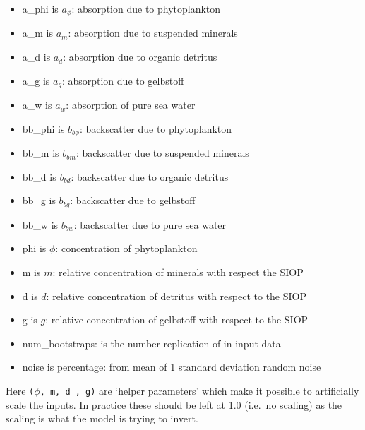 \documentclass{article}
\begin{document}
\begin{itemize}
\itemsep1pt\parskip0pt
\item
  a\_phi is $a_\phi$: absorption due to phytoplankton
\item
  a\_m is $a_m$: absorption due to suspended minerals
\item
  a\_d is $a_d$: absorption due to organic detritus
\item
  a\_g is $a_g$: absorption due to gelbstoff
\item
  a\_w is $a_w$: absorption of pure sea water
\item
  bb\_phi is $b_{b\phi}$: backscatter due to phytoplankton
\item
  bb\_m is $b_{bm}$: backscatter due to suspended minerals
\item
  bb\_d is $b_{bd}$: backscatter due to organic detritus
\item
  bb\_g is $b_{bg}$: backscatter due to gelbstoff
\item
  bb\_w is $b_{bw}$: backscatter due to pure sea water
\item
  phi is $\phi$: concentration of phytoplankton
\item
  m is $m$: relative concentration of minerals with respect the SIOP
\item
  d is $d$: relative concentration of detritus with respect to the SIOP
\item
  g is $g$: relative concentration of gelbstoff with respect to the SIOP
\item
  num\_bootstraps: is the number replication of in input data
\item
  noise is percentage: from mean of 1 standard deviation random noise
\end{itemize}

Here \texttt{(}$\phi$\texttt{, m, d , g)} are `helper parameters' which
make it possible to artificially scale the inputs. In practice these
should be left at 1.0 (i.e.~no scaling) as the scaling is what the model
is trying to invert.
\end{document}
